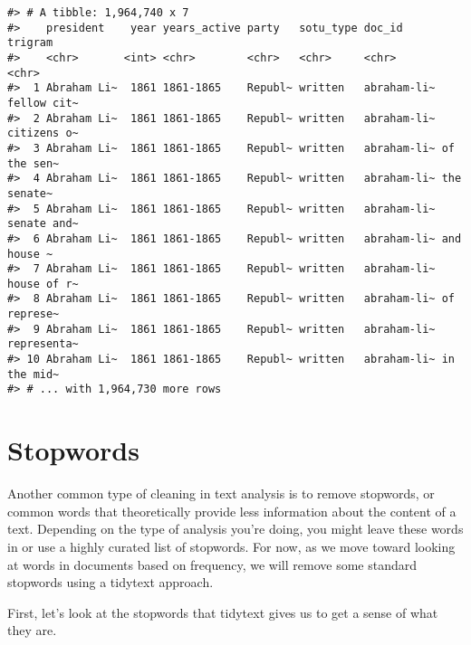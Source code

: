 \documentclass[]{book}
\newenvironment{Shaded}{\begin{snugshade}}{\end{snugshade}}
\newcommand{\CommentTok}[1]{\textcolor[rgb]{0.56,0.35,0.01}{\textit{#1}}}
\newcommand{\DataTypeTok}[1]{\textcolor[rgb]{0.13,0.29,0.53}{#1}}
\newcommand{\DecValTok}[1]{\textcolor[rgb]{0.00,0.00,0.81}{#1}}
\newcommand{\KeywordTok}[1]{\textcolor[rgb]{0.13,0.29,0.53}{\textbf{#1}}}
\newcommand{\NormalTok}[1]{#1}
\newcommand{\OperatorTok}[1]{\textcolor[rgb]{0.81,0.36,0.00}{\textbf{#1}}}
\newcommand{\StringTok}[1]{\textcolor[rgb]{0.31,0.60,0.02}{#1}}
\begin{document}
\begin{Shaded}
\end{Shaded}

\begin{verbatim}
#> # A tibble: 1,964,740 x 7
#>    president    year years_active party   sotu_type doc_id      trigram    
#>    <chr>       <int> <chr>        <chr>   <chr>     <chr>       <chr>      
#>  1 Abraham Li~  1861 1861-1865    Republ~ written   abraham-li~ fellow cit~
#>  2 Abraham Li~  1861 1861-1865    Republ~ written   abraham-li~ citizens o~
#>  3 Abraham Li~  1861 1861-1865    Republ~ written   abraham-li~ of the sen~
#>  4 Abraham Li~  1861 1861-1865    Republ~ written   abraham-li~ the senate~
#>  5 Abraham Li~  1861 1861-1865    Republ~ written   abraham-li~ senate and~
#>  6 Abraham Li~  1861 1861-1865    Republ~ written   abraham-li~ and house ~
#>  7 Abraham Li~  1861 1861-1865    Republ~ written   abraham-li~ house of r~
#>  8 Abraham Li~  1861 1861-1865    Republ~ written   abraham-li~ of represe~
#>  9 Abraham Li~  1861 1861-1865    Republ~ written   abraham-li~ representa~
#> 10 Abraham Li~  1861 1861-1865    Republ~ written   abraham-li~ in the mid~
#> # ... with 1,964,730 more rows
\end{verbatim}

\hypertarget{stopwords}{%
\section{Stopwords}\label{stopwords}}

Another common type of cleaning in text analysis is to remove stopwords, or common words that theoretically provide less information about the content of a text. Depending on the type of analysis you're doing, you might leave these words in or use a highly curated list of stopwords. For now, as we move toward looking at words in documents based on frequency, we will remove some standard stopwords using a tidytext approach.

First, let's look at the stopwords that tidytext gives us to get a sense of what they are.
\end{document}
